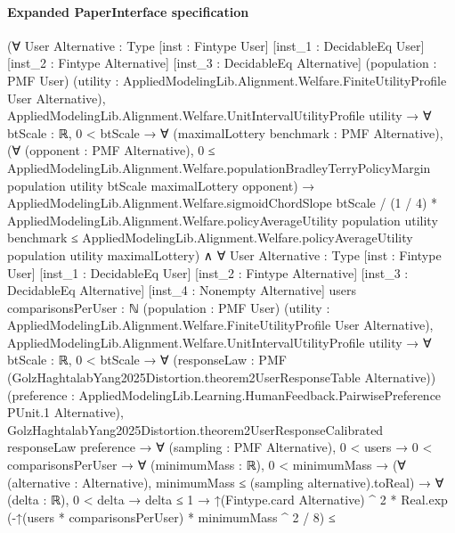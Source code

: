 \documentclass[10pt]{article}
\begin{document}
\paragraph{Expanded PaperInterface specification}
\begin{ReviewVerbatim}
(∀ {User Alternative : Type} [inst : Fintype User] [inst_1 : DecidableEq User] [inst_2 : Fintype Alternative]
    [inst_3 : DecidableEq Alternative] (population : PMF User)
    (utility : AppliedModelingLib.Alignment.Welfare.FiniteUtilityProfile User Alternative),
    AppliedModelingLib.Alignment.Welfare.UnitIntervalUtilityProfile utility →
      ∀ {btScale : ℝ},
        0 < btScale →
          ∀ (maximalLottery benchmark : PMF Alternative),
            (∀ (opponent : PMF Alternative),
                0 ≤
                  AppliedModelingLib.Alignment.Welfare.populationBradleyTerryPolicyMargin population utility btScale
                    maximalLottery opponent) →
              AppliedModelingLib.Alignment.Welfare.sigmoidChordSlope btScale / (1 / 4) *
                  AppliedModelingLib.Alignment.Welfare.policyAverageUtility population utility benchmark ≤
                AppliedModelingLib.Alignment.Welfare.policyAverageUtility population utility maximalLottery) ∧
  ∀ {User Alternative : Type} [inst : Fintype User] [inst_1 : DecidableEq User] [inst_2 : Fintype Alternative]
    [inst_3 : DecidableEq Alternative] [inst_4 : Nonempty Alternative] {users comparisonsPerUser : ℕ}
    (population : PMF User) (utility : AppliedModelingLib.Alignment.Welfare.FiniteUtilityProfile User Alternative),
    AppliedModelingLib.Alignment.Welfare.UnitIntervalUtilityProfile utility →
      ∀ {btScale : ℝ},
        0 < btScale →
          ∀ (responseLaw : PMF (GolzHaghtalabYang2025Distortion.theorem2UserResponseTable Alternative))
            (preference : AppliedModelingLib.Learning.HumanFeedback.PairwisePreference PUnit.{1} Alternative),
            GolzHaghtalabYang2025Distortion.theorem2UserResponseCalibrated responseLaw preference →
              ∀ (sampling : PMF Alternative),
                0 < users →
                  0 < comparisonsPerUser →
                    ∀ (minimumMass : ℝ),
                      0 < minimumMass →
                        (∀ (alternative : Alternative), minimumMass ≤ (sampling alternative).toReal) →
                          ∀ (delta : ℝ),
                            0 < delta →
                              delta ≤ 1 →
                                ↑(Fintype.card Alternative) ^ 2 *
                                      Real.exp (-↑(users * comparisonsPerUser) * minimumMass ^ 2 / 8) ≤

\end{ReviewVerbatim}
\end{document}
